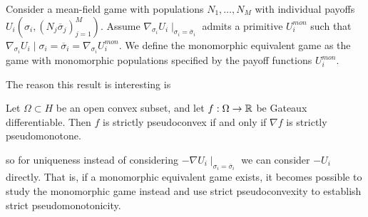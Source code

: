 \begin{definition}
  \label{def:correspondence}
  Consider a mean-field game with populations $N_1,\dots,N_M$ with individual payoffs $U_i(\sigma_i, (N_j \overbar{\sigma}_j)_{j=1}^M)$. Assume $\nabla_{\sigma_i}U_i\mid_{\sigma_i=\overbar{\sigma}_i}$ admits a primitive $U_i^{mon}$ such that $\nabla_{\sigma_i} U_i\mid{\sigma_i = \overbar{\sigma}_i} = \nabla_{\sigma_i} U_i^{mon}$.
   We define the monomorphic equivalent game as the game with monomorphic populations specified by the payoff functions $U_i^{mon}$.
\end{definition}
The reason this result is interesting is
\begin{theorem}
  Let $\Omega \subset H$ be an open convex subset, and let $f:\Omega \to \mathbb{R}$ be Gateaux differentiable. Then $f$ is strictly pseudoconvex if and only if $\nabla f$ is strictly pseudomonotone.
\end{theorem}
so for uniqueness instead of considering $-\nabla U_i \mid_{\sigma_i = \overbar{\sigma}_i}$ we can consider $-U_i$ directly. That is, if a monomorphic equivalent game exists, it becomes possible to study the monomorphic game instead and use strict pseudoconvexity to establish strict pseudomonotonicity.

